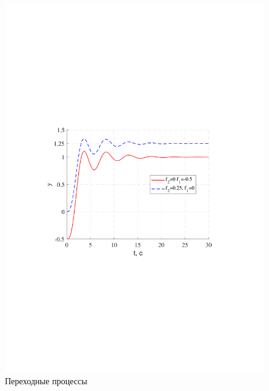 \documentclass[a4paper,12pt]{article}
\begin{document}
	\begin{figure}[h!]
		\begin{center}
		\renewcommand{\figurename}{Рисунок}
		\includegraphics[width=5in]{vozm1MOD.pdf}
		\caption{Переходные процессы} 
		\label{s_17} 
		\end{center}
	\end{figure}
\end{document}
